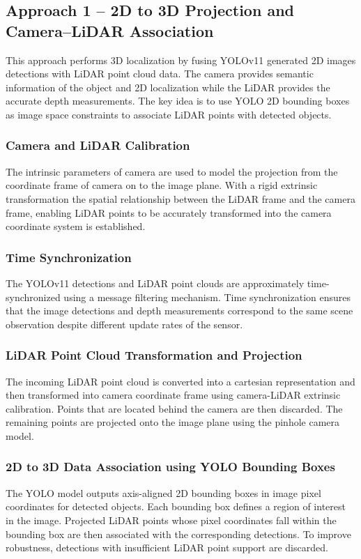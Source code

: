 \documentclass[12pt,a4paper]{report}
\begin{document}
\subsection{Approach 1 -- 2D to 3D Projection and Camera--LiDAR Association}
This approach performs 3D localization by fusing YOLOv11 generated 2D images detections with LiDAR point cloud data. The camera provides semantic information of the object and 2D localization while the LiDAR provides the accurate depth measurements. The key idea is to use YOLO 2D bounding boxes as image space constraints to associate LiDAR points with detected objects.

\subsubsection{Camera and LiDAR Calibration}
The intrinsic parameters of camera are used to model the projection from the coordinate frame of camera on to the image plane. With a rigid extrinsic transformation the spatial relationship between the LiDAR frame and the camera frame, enabling LiDAR points to be accurately transformed into the camera coordinate system is established.

\subsubsection{Time Synchronization}
The YOLOv11 detections and LiDAR point clouds are approximately time-synchronized using a message filtering mechanism. Time synchronization ensures that the image detections and depth measurements correspond to the same scene observation despite different update rates of the sensor.

\subsubsection{LiDAR Point Cloud Transformation and Projection}
The incoming LiDAR point cloud is converted into a cartesian representation and then transformed into camera coordinate frame using camera-LiDAR extrinsic calibration. Points that are located behind the camera are then discarded. The remaining points are projected onto the image plane using the pinhole camera model.

\subsubsection{2D to 3D Data Association using YOLO Bounding Boxes}
The YOLO model outputs axis-aligned 2D bounding boxes in image pixel coordinates for detected objects. Each bounding box defines a region of interest in the image. Projected LiDAR points whose pixel coordinates fall within the bounding box are then associated with the corresponding detections. To improve robustness, detections with insufficient LiDAR point support are discarded.
\end{document}
